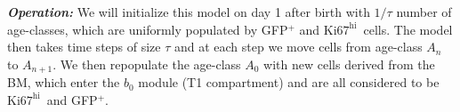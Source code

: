 \documentclass[11pt]{article}
\newcommand{\khi}{\ensuremath{\text{Ki67}^\text{hi}}~}
\newcommand\ie{$\textit{i.e.}$}
\begin{document}
\textbf{\textit{Operation:}}
We will initialize this model on day 1 after birth with $1/{\tau}$ number of age-classes, which are uniformly populated by GFP$^{+}$ and \khi cells. %
The model then takes time steps of size $\tau$ and at each step we move cells from age-class $A_n$ to $A_{n+1}$. %
We then repopulate the age-class $A_0$ with new cells derived from the BM, which enter the $b_0$ module (T1 compartment) and are all considered to be \khi and GFP$^{+}$.
\end{document}
